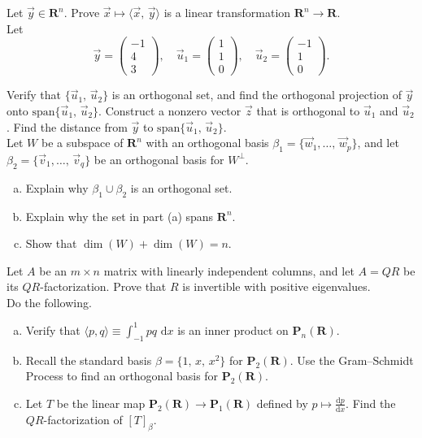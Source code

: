 \documentclass[a4paper,11pt]{article}
\newcommand{\R}{\mathbf{R}}
\newcommand{\PP}{\mathbf{P}}
\begin{document}
 Let $\vec y \in \R^n$. Prove $\vec x \mapsto
\langle \vec x,\,\vec y \rangle$ is a linear transformation $\R^n \rightarrow
\R$. \\

 Let
\[
  \vec y =
  \left(
    \begin{array}{r}
      -1\\4\\3
    \end{array}
  \right), \quad
  \vec u_1 =
  \left(
    \begin{array}{r}
      1\\1\\0
    \end{array}
  \right), \quad
  \vec u_2 =
  \left(
    \begin{array}{r}
      -1\\1\\0
    \end{array}
  \right).
\]

\noindent Verify that $\{\vec u_1,\,\vec u_2\}$ is an orthogonal set, and find
the orthogonal projection of $\vec y$ onto $\text{span}\{\vec u_1,\,\vec u_2\}$.
Construct a nonzero vector $\vec z$ that is orthogonal to $\vec u_1$ and $\vec
u_2$. Find the distance from $\vec y$ to $\text{span}\{\vec u_1,\,\vec u_2\}$.
\\

 Let $W$ be a subspace of $\R^n$ with an orthogonal
basis $\beta_1=\{\vec w_1, \dots,\,\vec w_p\}$, and let $\beta_2=\{\vec
v_1,\dots,\,\vec v_q\}$ be an orthogonal basis for $W^\perp$.
\begin{enumerate}[(a)]
\item Explain why $\beta_1 \cup \beta_2$ is an orthogonal set.
\item Explain why the set in part (a) spans $\R^n$.
\item Show that $\dim(W)+\dim(W)=n$. \\
\end{enumerate}

 Let $A$ be an $m \times n$ matrix with linearly
independent columns, and let $A=QR$ be its $QR$-factorization. Prove that $R$ is
invertible with positive eigenvalues. \\

 Do the following.
\begin{enumerate}[(a)]
\item Verify that $\langle p,q \rangle \equiv \int_{-1}^1pq\text{ d}x$ is an
  inner product on $\PP_n(\R)$.
\item Recall the standard basis $\beta=\{1,\,x,\,x^2\}$ for $\PP_2(\R)$. Use the
  Gram--Schmidt Process to find an orthogonal basis for $\PP_2(\R)$.
\item Let $T$ be the linear map $\PP_2(\R) \rightarrow \PP_1(\R)$ defined by $p
  \mapsto \frac{\text{d}p}{\text{d}x}$. Find the $QR$-factorization of
  $[T]_\beta$.
\end{enumerate}
\end{document}

